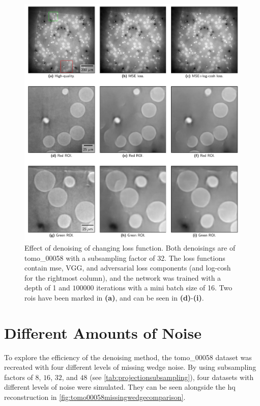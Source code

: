 \begin{figure}[htbp]
  \centering
  \includegraphics[width=.9\textwidth]{figures/losschangedenoisingcomparison.pdf}
  \caption[Effect on denoising of changing loss function]{Effect of denoising of changing loss function. Both denoisings are of tomo\_00058 with a subsampling factor of 32. The loss functions contain \gls{mse}, VGG, and adversarial loss components (and log-cosh for the rightmost column), and the network was trained with a depth of 1 and $100000$ iterations with a mini batch size of 16. Two \gls{roi}s have been marked in \textbf{(a)}, and can be seen in \textbf{(d)}-\textbf{(i)}. }
  \label{fig:losschangedenoisingcomparison}
\end{figure}



\section{Different Amounts of Noise}
To explore the efficiency of the denoising method, the tomo\_00058 dataset was recreated with four different levels of missing wedge noise. By using subsampling factors of $8$, $16$, $32$, and $48$ (see \cref{tab:projectionsubsampling}), four datasets with different levels of noise were simulated. They can be seen alongside the \gls{hq} reconstruction in \cref{fig:tomo00058missingwedgecomparison}. 

